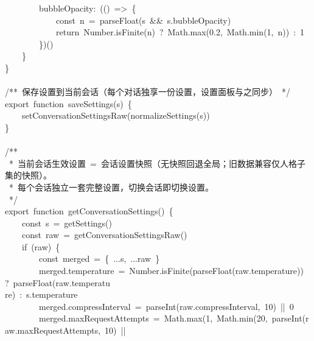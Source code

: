 \documentclass[a4paper,10pt]{article}
\begin{document}
{~~~~~~~~bubbleOpacity:~(()~=>~\{\\
~~~~~~~~~~~~const~n~=~parseFloat(s~\&\&~s.bubbleOpacity)\\
~~~~~~~~~~~~return~Number.isFinite(n)~?~Math.max(0.2,~Math.min(1,~n))~:~1\\
~~~~~~~~\})()\\
~~~~\}\\
\}\\
\mbox{}\\
/**~保存设置到当前会话（每个对话独享一份设置，设置面板与之同步）~*/\\
export~function~saveSettings(s)~\{\\
~~~~setConversationSettingsRaw(normalizeSettings(s))\\
\}\\
\mbox{}\\
/**\\
~*~当前会话生效设置~=~会话设置快照（无快照回退全局；旧数据兼容仅人格子集的快照）。\\
~*~每个会话独立一套完整设置，切换会话即切换设置。\\
~*/\\
export~function~getConversationSettings()~\{\\
~~~~const~s~=~getSettings()\\
~~~~const~raw~=~getConversationSettingsRaw()\\
~~~~if~(raw)~\{\\
~~~~~~~~const~merged~=~\{~...s,~...raw~\}\\
~~~~~~~~merged.temperature~=~Number.isFinite(parseFloat(raw.temperature))~?~parseFloat(raw.temperatu\\
re)~:~s.temperature\\
~~~~~~~~merged.compressInterval~=~parseInt(raw.compressInterval,~10)~||~0\\
~~~~~~~~merged.maxRequestAttempts~=~Math.max(1,~Math.min(20,~parseInt(raw.maxRequestAttempts,~10)~||
}

\newpage
\end{document}
